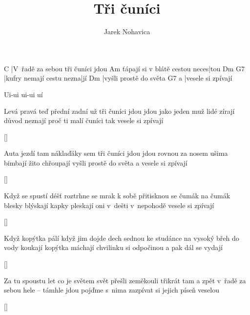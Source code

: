 \documentclass{song}
\author{Jarek Nohavica}
\title{Tři čuníci}
\begin{document}
\begin{multicols}{2}
\strophe
C
|V~řadě za sebou tři čuníci jdou
                              Am
ťápají si v blátě cestou neces|tou
Dm                       G7
|kufry nemají cestu nezna|jí
Dm
|vyšli prostě do světa
  G7
a |vesele si zpívají
\endstrophe

 Ui-ui ui-ui uí
\endstrophe

\strophe*
Levá pravá teď přední zadní už
tři čuníci jdou jdou jako jeden muž
lidé zírají důvod neznají
proč ti malí čuníci
tak vesele si zpívají
\endstrophe

\ref{}

\strophe*
Auta jezdí tam náklaďáky sem
tři čuníci jdou jdou rovnou za nosem
ušima bimbají žito chřoupají
vyšli prostě do světa
a vesele si zpívají
\endstrophe

\ref{}

\columnbreak

\strophe*
Když se spustí déšť roztrhne se mrak
k sobě přitisknou se čumák na čumák
blesky blýskají kapky pleskají
oni v~dešti v~nepohodě
vesele si zpívají
\endstrophe

\ref{}

\strophe*
Když kopýtka pálí když jim dojde dech
sednou ke studánce na vysoký břeh
do vody koukají kopýtka máchají
chvilinku si odpočinou
a pak dál se vydají
\endstrophe

\ref{}

\strophe*
Za tu spoustu let co je světem svět
přešli zeměkouli třikrát tam a zpět
v~řadě za sebou hele -- támhle jdou
pojďme s~nima zazpívat si
jejich píseň veselou
\endstrophe

\ref{}

\end{multicols}
\end{document}
